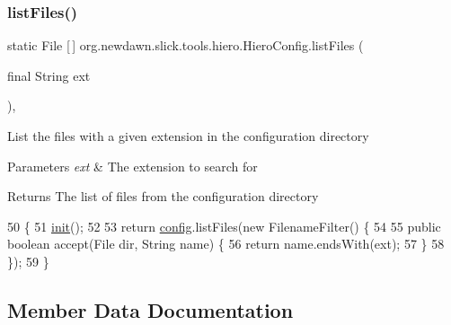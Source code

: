 \subsubsection{\texorpdfstring{list\+Files()}{listFiles()}}
{\footnotesize\ttfamily static File \mbox{[}$\,$\mbox{]} org.\+newdawn.\+slick.\+tools.\+hiero.\+Hiero\+Config.\+list\+Files (\begin{DoxyParamCaption}\item[{final String}]{ext }\end{DoxyParamCaption})\hspace{0.3cm}{\ttfamily [inline]}, {\ttfamily [static]}}

List the files with a given extension in the configuration directory


\begin{DoxyParams}{Parameters}
{\em ext} & The extension to search for \\
\hline
\end{DoxyParams}
\begin{DoxyReturn}{Returns}
The list of files from the configuration directory 
\end{DoxyReturn}

\begin{DoxyCode}
50                                                      \{
51         \mbox{\hyperlink{classorg_1_1newdawn_1_1slick_1_1tools_1_1hiero_1_1_hiero_config_a2c29572e725d71d622efa31e2c4b0766}{init}}();
52         
53         \textcolor{keywordflow}{return} \mbox{\hyperlink{classorg_1_1newdawn_1_1slick_1_1tools_1_1hiero_1_1_hiero_config_a13063195c209bdd37f19d27a938cc508}{config}}.listFiles(\textcolor{keyword}{new} FilenameFilter() \{
54 
55             \textcolor{keyword}{public} \textcolor{keywordtype}{boolean} accept(File dir, String name) \{
56                 \textcolor{keywordflow}{return} name.endsWith(ext);
57             \}
58         \});
59     \}
\end{DoxyCode}


\subsection{Member Data Documentation}
\mbox{\label{classorg_1_1newdawn_1_1slick_1_1tools_1_1hiero_1_1_hiero_config_a13063195c209bdd37f19d27a938cc508}} 
